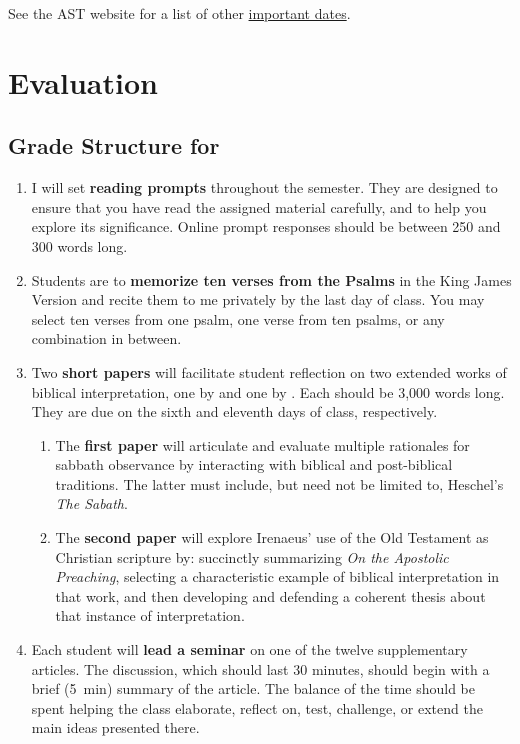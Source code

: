 \documentclass[titlepage]{article}
\begin{document}
See the AST website for a list of other \href{http://www.astheology.ns.ca/students/academic-dates.html}{important dates}.

\section{Evaluation}
\label{evaluation}

\subsection{Grade Structure for \ccode}
\label{structure}

\begin{enumerate}

	\item I will set \textbf{reading prompts} throughout the semester.
	They are designed to ensure that you have read the assigned material
	carefully, and to help you explore its significance. Online prompt
	responses should be between 250 and 300 words long.

	\item Students are to \textbf{memorize ten verses from the Psalms}
	in the King James Version and recite them to me privately by the
	last day of class. You may select ten verses from one psalm, one
	verse from ten psalms, or any combination in between.

	\item Two \textbf{short papers} will facilitate student reflection
	on two extended works of biblical interpretation, one by
	\cite{heschel} and one by \cite{irenaeus}. Each should be 3,000
	words long. They are due on the sixth and eleventh days of class,
	respectively.

	\begin{enumerate}

		\item The \textbf{first paper} will articulate and evaluate
		multiple rationales for sabbath observance by interacting with
		biblical and post-biblical traditions. The latter must include,
		but need not be limited to, Heschel's \emph{The Sabath}.

		\item The \textbf{second paper} will explore Irenaeus' use of
		the Old Testament as Christian scripture by: succinctly
		summarizing \emph{On the Apostolic Preaching}, selecting a
		characteristic example of biblical interpretation in that work,
		and then developing and defending a coherent thesis about that
		instance of interpretation.

	\end{enumerate}

	\item Each student will \textbf{lead a seminar} on one of the twelve
	supplementary articles. The discussion, which should last 30
	minutes, should begin with a brief (5~min) summary of the article.
	The balance of the time should be spent helping the class elaborate,
	reflect on, test, challenge, or extend the main ideas presented
	there.

\end{enumerate}
\end{document}
